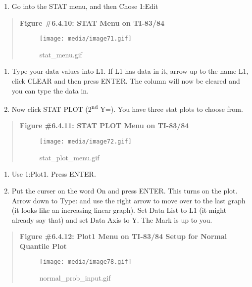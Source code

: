 \documentclass[]{book}
\providecommand{\tightlist}{%
  \setlength{\itemsep}{0pt}\setlength{\parskip}{0pt}}
\begin{document}
\begin{enumerate}
\def\labelenumi{\arabic{enumi}.}
\tightlist
\item
  Go into the STAT menu, and then Chose 1:Edit
\end{enumerate}

\begin{quote}
\textbf{Figure \#6.4.10: STAT Menu on TI-83/84}

\begin{figure}
\centering
\texttt{[image: media/image71.gif]}
\caption{stat\_menu.gif}
\end{figure}
\end{quote}

\begin{enumerate}
\def\labelenumi{\arabic{enumi}.}
\setcounter{enumi}{1}
\item
  Type your data values into L1. If L1 has data in it, arrow up to the
  name L1, click CLEAR and then press ENTER. The column will now be
  cleared and you can type the data in.
\item
  Now click STAT PLOT (2\textsuperscript{nd} Y=). You have three stat plots to choose
  from.
\end{enumerate}

\begin{quote}
\textbf{Figure \#6.4.11: STAT PLOT Menu on TI-83/84}

\begin{figure}
\centering
\texttt{[image: media/image72.gif]}
\caption{stat\_plot\_menu.gif}
\end{figure}
\end{quote}

\begin{enumerate}
\def\labelenumi{\arabic{enumi}.}
\setcounter{enumi}{3}
\item
  Use 1:Plot1. Press ENTER.
\item
  Put the curser on the word On and press ENTER. This turns on the
  plot. Arrow down to Type: and use the right arrow to move over to
  the last graph (it looks like an increasing linear graph). Set Data
  List to L1 (it might already say that) and set Data Axis to Y. The
  Mark is up to you.
\end{enumerate}

\begin{quote}
\textbf{Figure \#6.4.12: Plot1 Menu on TI-83/84 Setup for Normal Quantile
Plot}

\begin{figure}
\centering
\texttt{[image: media/image78.gif]}
\caption{normal\_prob\_input.gif}
\end{figure}
\end{quote}
\end{document}
